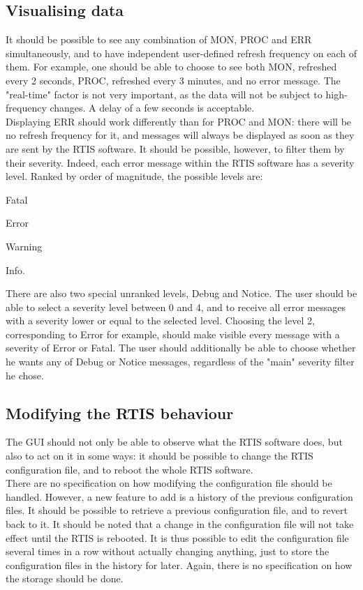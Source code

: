 \documentclass{themeensg}
\begin{document}
\subsection{Visualising data}

It should be possible to see any combination of MON, PROC and ERR simultaneously, and to have independent user-defined refresh frequency on each of them. For example, one should be able to choose to see both MON, refreshed every 2 seconds, PROC, refreshed every 3 minutes, and no error message. The "real-time" factor is not very important, as the data will not be subject to high-frequency changes. A delay of a few seconds is acceptable.\\

Displaying ERR should work differently than for PROC and MON: there will be no refresh frequency for it, and messages will always be displayed as soon as they are sent by the RTIS software. It should be possible, however, to filter them by their severity. Indeed, each error message within the RTIS software has a severity level. Ranked by order of magnitude, the possible levels are: \begin{enumerate*}
  \item Fatal
  \item Error
  \item Warning
  \item Info.
\end{enumerate*}
There are also two special unranked levels, Debug and Notice. The user should be able to select a severity level between 0 and 4, and to receive all error messages with a severity lower or equal to the selected level. Choosing the level 2, corresponding to Error for example, should make visible every message with a severity of Error or Fatal. The user should additionally be able to choose whether he wants any of Debug or Notice messages, regardless of the "main" severity filter he chose.

\subsection{Modifying the RTIS behaviour}

The GUI should not only be able to observe what the RTIS software does, but also to act on it in some ways: it should be possible to change the RTIS configuration file, and to reboot the whole RTIS software.\\

There are no specification on how modifying the configuration file should be handled. However, a new feature to add is a history of the previous configuration files. It should be possible to retrieve a previous configuration file, and to revert back to it. It should be noted that a change in the configuration file will not take effect until the RTIS is rebooted. It is thus possible to edit the configuration file several times in a row without actually changing anything, just to store the configuration files in the history for later. Again, there is no specification on how the storage should be done.
\end{document}
